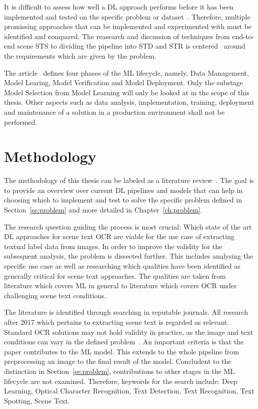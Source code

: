 It is difficult to assess how well a \ac{DL} approach performs before it has been
implemented and tested on the specific problem or dataset~\citep{arpteg_software_2018}.
Therefore, multiple promissing approaches that can be implemented and experimented with must
be identified and compared.
The reasearch and discussion of techniques from end-to-end scene \ac{STS} to dividing the
pipeline into \ac{STD} and \ac{STR} is centered~\cite{chen_text_2021} around the
requirements which are given by the problem.

The article~\cite{ashmore_assuring_2021} defines four phases of the \ac{ML} lifecycle, namely,
Data Management, Model Learing, Model Verification and Model Deployment.
Only the substage Model Selection from Model Learning will only be looked at in the scope of this
thesis.
Other aspects such as data analysis, implementation, training, deployment and maintenance of a
solution in a production environment shall not be performed.

\section{Methodology}\label{se:methodology}
The methodology of this thesis can be labeled as a literature review~\citep{snyder_literature_2019,
torraco_writing_2005}.
The goal is to provide an overview over current \ac{DL} pipelines and models that can help in
choosing which to implement and test to solve the specific problem defined in
Section~\ref{se:problem} and more detailed in Chapter~\ref{ch:problem}.

The research question guiding the process is most crucial: Which state of the art \ac{DL}
approaches for scene text \ac{OCR} are viable for the use case of extracting textual label data from
images.
In order to improve the validity for the subsequent analysis, the problem is dissected further.
This includes analysing the specific use case as well as researching which qualities have been
identified as generally critical for scene text approaches.
The qualities are taken from literature which covers \ac{ML} in general to literature
which covers \ac{OCR} under challenging scene text conditions.

The literature is identified through searching in reputable journals.
All research after 2017 which pertains to extracting scene text is regarded as relevant.
Standard \ac{OCR} solutions may not hold validity in practice, as the image and text conditions can
vary in the defined problem~\citep{chen_text_2021}.
An important criteria is that the paper contributes to the \ac{ML} model.
This extends to the whole pipeline  from preprocessing an image to the final result of the model.
Concludent to the distinction in Section~\ref{se:problem}, contributions to other stages in the
\ac{ML} lifecycle are not examined.
Therefore, keywords for the search include: Deep Learning, Optical Character Recognition,
Text Detection, Text Recognition, Text Spotting, Scene Text.

